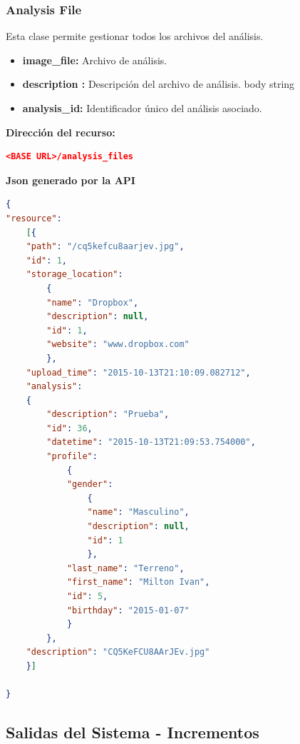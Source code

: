 \documentclass[a4paper,12pt]{article}
\begin{document}
\subsubsection{Analysis File}
Esta clase permite gestionar todos los archivos del análisis.
\begin{itemize}
	\item \textbf{image\_file:	}	Archivo de análisis.
	\item \textbf{description :}	Descripción del archivo de análisis. 	body 	string
	\item \textbf{	analysis\_id:	}Identificador único del análisis asociado.
\end{itemize}
\textbf{Dirección del recurso:}
\begin{lstlisting}[language=json,firstnumber=1]
<BASE URL>/analysis_files
\end{lstlisting}
\textbf{Json generado por la API} 
\begin{lstlisting}[language=json,firstnumber=1]
{
"resource": 
	[{
	"path": "/cq5kefcu8aarjev.jpg",
	"id": ​1,
	"storage_location": 
		{
		"name": "Dropbox",
		"description": null,
		"id": ​1,
		"website": "www.dropbox.com"
		},
	"upload_time": "2015-10-13T21:10:09.082712",
	"analysis": 
	{
		"description": "Prueba",
		"id": ​36,
		"datetime": "2015-10-13T21:09:53.754000",
		"profile": 
			{
			"gender": 
				{
				"name": "Masculino",
				"description": null,
				"id": ​1
				},
			"last_name": "Terreno",
			"first_name": "Milton Ivan",
			"id": ​5,
			"birthday": "2015-01-07"
			}
		},
	"description": "CQ5KeFCU8AArJEv.jpg"
	}]

}
\end{lstlisting}
\clearpage
\subsection {Salidas del Sistema - Incrementos}
\end{document}
